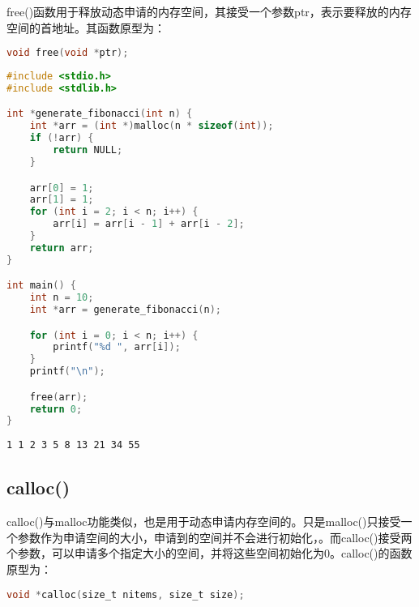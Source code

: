 free()函数用于释放动态申请的内存空间，其接受一个参数ptr，表示要释放的内存空间的首地址。其函数原型为：

\vspace{-0.5cm}

\begin{lstlisting}[language=C]
void free(void *ptr);
\end{lstlisting}

\vspace{0.5cm}


\begin{lstlisting}[language=C]
#include <stdio.h>
#include <stdlib.h>

int *generate_fibonacci(int n) {
    int *arr = (int *)malloc(n * sizeof(int));
    if (!arr) {
        return NULL;
    }

    arr[0] = 1;
    arr[1] = 1;
    for (int i = 2; i < n; i++) {
        arr[i] = arr[i - 1] + arr[i - 2];
    }
    return arr;
}

int main() {
    int n = 10;
    int *arr = generate_fibonacci(n);

    for (int i = 0; i < n; i++) {
        printf("%d ", arr[i]);
    }
    printf("\n");

    free(arr);
    return 0;
}
\end{lstlisting}

\begin{tcolorbox}
    \begin{verbatim}
1 1 2 3 5 8 13 21 34 55
	\end{verbatim}
\end{tcolorbox}

\vspace{0.5cm}

\subsection{calloc()}

calloc()与malloc功能类似，也是用于动态申请内存空间的。只是malloc()只接受一个参数作为申请空间的大小，申请到的空间并不会进行初始化，。而calloc()接受两个参数，可以申请多个指定大小的空间，并将这些空间初始化为0。calloc()的函数原型为：

\vspace{-0.5cm}

\begin{lstlisting}[language=C]
void *calloc(size_t nitems, size_t size);
\end{lstlisting}

